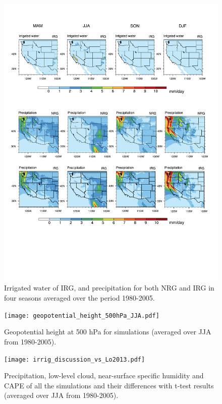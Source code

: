 \documentclass[draft,ms]{agutexSI}
\begin{document}
 
\begin{figure}
\begin{center}
\includegraphics[width=6in]{irrigated_water_and_precipitation_4seasons.pdf}
\caption{Irrigated water of IRG, and precipitation for both NRG and IRG in four seasons averaged over the period 1980-2005.}
\end{center}
\end{figure}

\begin{figure}
\begin{center}
\texttt{[image: geopotential\_height\_500hPa\_JJA.pdf]}
\caption{Geopotential height at 500 hPa for simulations (averaged over JJA from 1980-2005).}
\end{center}
\end{figure}

\begin{figure}
\begin{center}
\texttt{[image: irrig\_discussion\_vs\_Lo2013.pdf]}
\caption{Precipitation, low-level cloud, near-surface specific humidity and CAPE of all the simulations and their differences with t-test results (averaged over JJA from 1980-2005).}
\end{center}
\end{figure}
\end{document}
